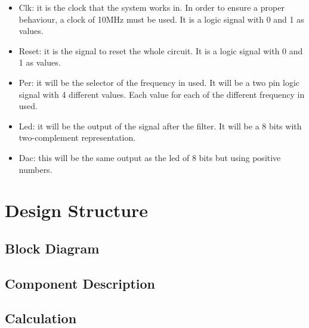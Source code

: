 \documentclass[a4paper, 12pt]{article}
\begin{document}
\begin{itemize}
\item Clk: it is the clock that the system works in. In order to ensure a proper behaviour, a clock of 10MHz must be used. It is a logic signal with 0 and 1 as values.
\item Reset: it is the signal to reset the whole circuit. It is a logic signal with 0 and 1 as values.
\item Per: it will be the selector of the frequency in used. It will be a two pin logic signal with 4 different values. Each value for each of the different frequency in used.
\item Led: it will be the output of the signal after the filter. It will be a 8 bits with two-complement representation.
\item Dac: this will be the same output as the led of 8 bits but using positive numbers.
\end{itemize}
\section{Design Structure}
\label{sec:orge7be5e4}

\subsection{Block Diagram}
\label{sec:orgbd93954}

\subsection{Component Description}
\label{sec:org7a16e40}
\subsection{Calculation}
\label{sec:orge933762}
\end{document}
